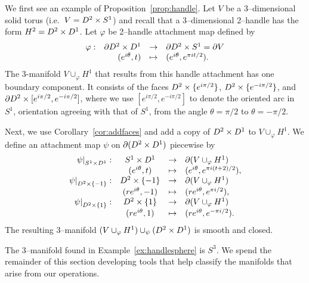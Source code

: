 \begin{ex}
	\label{ex:handlesphere}
	We first see an example of Proposition~\ref{prop:handle}.
	Let $V$ be a 3--dimensional solid torus (i.e.\ $V=D^2\times S^1$) and recall that a 3--dimensional 2--handle has the form $H^2=D^2\times D^1$.
	Let $\varphi$ be 2--handle attachment map defined by
	\[
		\begin{array}{rrcl}
			\varphi:	&	\partial D^2\times D^1	&	\to		&	\partial D^2\times S^1=\partial V	\\
						&	(e^{i\theta},t)		&	\mapsto	&	(e^{i\theta},e^{\pi it/2}).
		\end{array}
	\]
	The 3-manifold $V\cup_{\varphi}H^1$ that results from this handle attachment has one boundary component.
	It consists of the faces $D^2\times\{e^{i\pi/2}\}$, $D^2\times\{e^{-i\pi/2}\}$, and $\partial D^2\times[e^{i\pi/2},e^{-i\pi/2}]$, where we use $[e^{i\pi/2},e^{-i\pi/2}]$ to denote the oriented arc in $S^1$, orientation agreeing with that of $S^1$, from the angle $\theta=\pi/2$ to $\theta=-\pi/2$.
	
	Next, we use Corollary~\ref{cor:addfaces} and add a copy of $D^2\times D^1$ to $V\cup_{\varphi}H^1$.
	We define an attachment map $\psi$ on $\partial(D^2\times D^1)$ piecewise by
	\[
		\begin{array}{rccl}
			\left.\psi\right|_{S^1\times D^1}:
				&	S^1\times D^1
				&	\to	
				&	\partial (V\cup_\varphi H^1)			\\
			
				&	(e^{i\theta},t)
				&	\mapsto
				&	(e^{i\theta},e^{\pi i(t+2)/2}),	\\

			\left.\psi\right|_{D^2\times\{-1\}}:
				&	D^2\times\{-1\}
				&	\to	
				&	\partial (V\cup_\varphi H^1)			\\
				
				&	(re^{i\theta},-1)
				&	\mapsto
				&	(re^{i\theta},e^{\pi i/2}),		\\
				
			\left.\psi\right|_{D^2\times\{1\}}:
				&	D^2\times\{1\}
				&	\to	
				&	\partial (V\cup_\varphi H^1)			\\
				
				&	(re^{i\theta},1)
				&	\mapsto
				&	(re^{i\theta},e^{-\pi i/2}).
		\end{array}
	\]
	The resulting 3--manifold $(V\cup_\varphi H^1)\cup_\psi (D^2\times D^1)$ is smooth and closed.	
\end{ex}

The 3--manifold found in Example~\ref{ex:handlesphere} is $S^3$.
We spend the remainder of this section developing tools that help classify the manifolds that arise from our operations.

